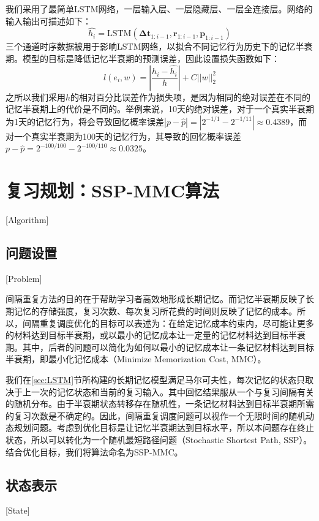 我们采用了最简单LSTM网络，一层输入层、一层隐藏层、一层全连接层。网络的输入输出可描述如下：
\begin{equation}
\hat{h_i}=\mathrm{LSTM}(\bm{\Delta t}_{1:i-1}, \bm r_{1:i-1}, \bm p_{1:i-1})
\end{equation}
三个通道时序数据被用于影响LSTM网络，以拟合不同记忆行为历史下的记忆半衰期。模型的目标是降低记忆半衰期的预测误差，因此设置损失函数如下：
\begin{equation}
l(e_i,w)=|\frac{h_i-\hat{h_i}}{h}|+C||w||_{2}^{2}
\end{equation}
之所以我们采用$h$的相对百分比误差作为损失项，是因为相同的绝对误差在不同的记忆半衰期上的代价是不同的。举例来说，10天的绝对误差，对于一个真实半衰期为1天的记忆行为，将会导致回忆概率误差$|p-\hat{p}|=|2^{-1/1}-2^{-1/11}|\approx 0.4389$，而对一个真实半衰期为100天的记忆行为，其导致的回忆概率误差$p-\hat{p}=2^{-100/100}-2^{-100/110}\approx 0.0325$。

\section{复习规划：SSP-MMC算法}[Algorithm]

\subsection{问题设置}[Problem]

间隔重复方法的目的在于帮助学习者高效地形成长期记忆。而记忆半衰期反映了长期记忆的存储强度，复习次数、每次复习所花费的时间则反映了记忆的成本。所以，间隔重复调度优化的目标可以表述为：在给定记忆成本约束内，尽可能让更多的材料达到目标半衰期，或以最小的记忆成本让一定量的记忆材料达到目标半衰期。其中，后者的问题可以简化为如何以最小的记忆成本让一条记忆材料达到目标半衰期，即最小化记忆成本（Minimize Memorization Cost, MMC）。

我们在\ref{sec:LSTM}节所构建的长期记忆模型满足马尔可夫性，每次记忆的状态只取决于上一次的记忆状态和当前的复习输入。其中回忆结果服从一个与复习间隔有关的随机分布。由于半衰期状态转移存在随机性，一条记忆材料达到目标半衰期所需的复习次数是不确定的。因此，间隔重复调度问题可以视作一个无限时间的随机动态规划问题。考虑到优化目标是让记忆半衰期达到目标水平，所以本问题存在终止状态，所以可以转化为一个随机最短路径问题\cite[177-182]{bertsekasReinforcementLearningOptimal2019}（Stochastic Shortest Path, SSP）。结合优化目标，我们将算法命名为SSP-MMC。

\subsection{状态表示}[State]

